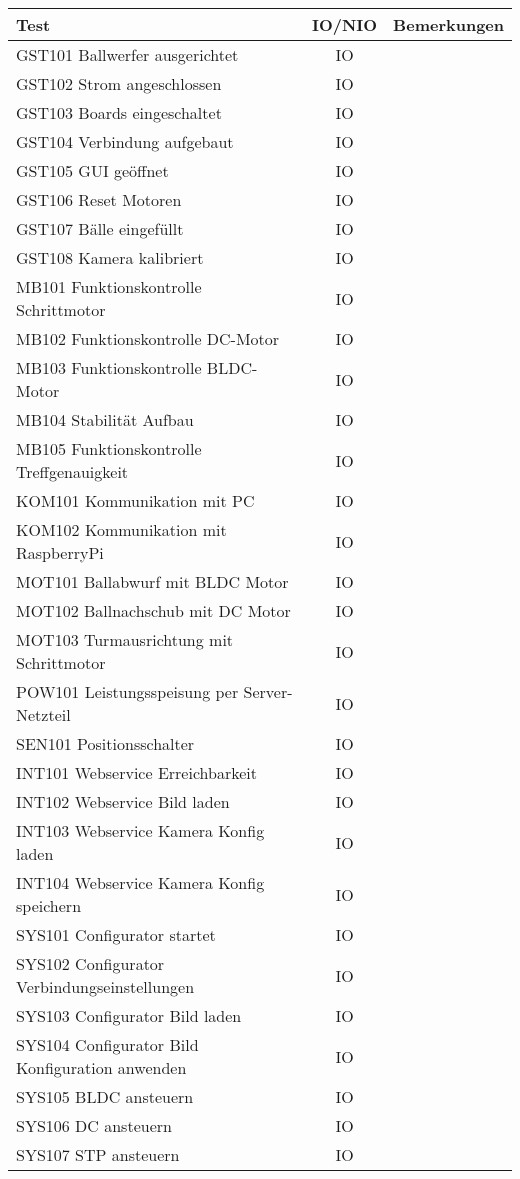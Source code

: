 \begin{table}[h!]
	\centering
	\renewcommand{\arraystretch}{1.5}
	\begin{tabular}{|l|c|p{8cm}|}
		\hline \textbf{Test} & \textbf{IO/NIO} & \textbf{Bemerkungen} \\
		\hline GST101 Ballwerfer ausgerichtet & IO & \\
		\hline GST102 Strom angeschlossen & IO & \\
		\hline GST103 Boards eingeschaltet & IO & \\
		\hline GST104 Verbindung aufgebaut & IO & \\
		\hline GST105 GUI geöffnet & IO & \\
		\hline GST106 Reset Motoren & IO & \\
		\hline GST107 Bälle eingefüllt & IO & \\
		\hline GST108 Kamera kalibriert & IO & \\
		\hline MB101 Funktionskontrolle Schrittmotor & IO & \\
		\hline MB102 Funktionskontrolle DC-Motor & IO & \\
		\hline MB103 Funktionskontrolle BLDC-Motor & IO & \\
		\hline MB104 Stabilität Aufbau & IO & \\
		\hline MB105 Funktionskontrolle Treffgenauigkeit & IO & \\
		\hline KOM101 Kommunikation mit PC & IO & \\
		\hline KOM102 Kommunikation mit RaspberryPi & IO & \\
		\hline MOT101 Ballabwurf mit BLDC Motor & IO & \\
		\hline MOT102 Ballnachschub mit DC Motor & IO & \\
		\hline MOT103 Turmausrichtung mit Schrittmotor & IO & \\
		\hline POW101 Leistungsspeisung per Server-Netzteil & IO & \\
		\hline SEN101 Positionsschalter & IO & \\
		\hline INT101 Webservice Erreichbarkeit & IO & \\
		\hline INT102 Webservice Bild laden & IO & \\
		\hline INT103 Webservice Kamera Konfig laden & IO & \\
		\hline INT104 Webservice Kamera Konfig speichern & IO & \\
		\hline SYS101 Configurator startet & IO & \\
		\hline SYS102 Configurator Verbindungseinstellungen & IO & \\
		\hline SYS103 Configurator Bild laden & IO & \\
		\hline SYS104 Configurator Bild Konfiguration anwenden & IO & \\
		\hline SYS105 BLDC ansteuern & IO & \\
		\hline SYS106 DC ansteuern & IO & \\
		\hline SYS107 STP ansteuern & IO & \\
		\hline 
	\end{tabular}
\end{table}